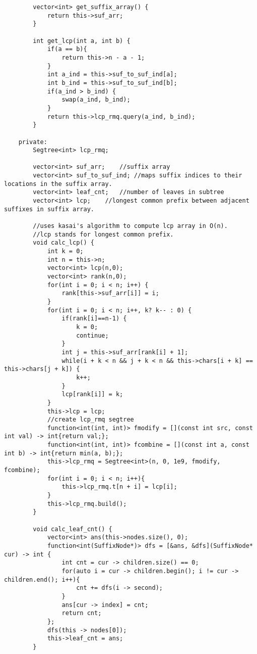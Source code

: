 \documentclass[8pt, headheight=10pt, a4paper]{article}
\begin{document}
\begin{multicols*}{3}
\begin{lstlisting}
        vector<int> get_suffix_array() {
            return this->suf_arr;
        }

        int get_lcp(int a, int b) {
            if(a == b){
                return this->n - a - 1;
            }
            int a_ind = this->suf_to_suf_ind[a];
            int b_ind = this->suf_to_suf_ind[b];
            if(a_ind > b_ind) {
                swap(a_ind, b_ind);
            }
            return this->lcp_rmq.query(a_ind, b_ind);
        }

    private:
        Segtree<int> lcp_rmq;

        vector<int> suf_arr;    //suffix array
        vector<int> suf_to_suf_ind; //maps suffix indices to their locations in the suffix array. 
        vector<int> leaf_cnt;   //number of leaves in subtree
        vector<int> lcp;    //longest common prefix between adjacent suffixes in suffix array. 

        //uses kasai's algorithm to compute lcp array in O(n). 
        //lcp stands for longest common prefix.
        void calc_lcp() {
            int k = 0;
            int n = this->n;
            vector<int> lcp(n,0);
            vector<int> rank(n,0);
            for(int i = 0; i < n; i++) {
                rank[this->suf_arr[i]] = i;
            }
            for(int i = 0; i < n; i++, k? k-- : 0) {
                if(rank[i]==n-1) {
                    k = 0; 
                    continue;
                }
                int j = this->suf_arr[rank[i] + 1];
                while(i + k < n && j + k < n && this->chars[i + k] == this->chars[j + k]) {
                    k++;
                }
                lcp[rank[i]] = k;
            }
            this->lcp = lcp;
            //create lcp_rmq segtree
            function<int(int, int)> fmodify = [](const int src, const int val) -> int{return val;};
            function<int(int, int)> fcombine = [](const int a, const int b) -> int{return min(a, b);};
            this->lcp_rmq = Segtree<int>(n, 0, 1e9, fmodify, fcombine);
            for(int i = 0; i < n; i++){
                this->lcp_rmq.t[n + i] = lcp[i];
            }
            this->lcp_rmq.build();
        }

        void calc_leaf_cnt() {
            vector<int> ans(this->nodes.size(), 0);
            function<int(SuffixNode*)> dfs = [&ans, &dfs](SuffixNode* cur) -> int {
                int cnt = cur -> children.size() == 0;
                for(auto i = cur -> children.begin(); i != cur -> children.end(); i++){
                    cnt += dfs(i -> second);
                }
                ans[cur -> index] = cnt;
                return cnt;
            };
            dfs(this -> nodes[0]);
            this->leaf_cnt = ans;
        }


\end{lstlisting}
\end{multicols*}
\end{document}
